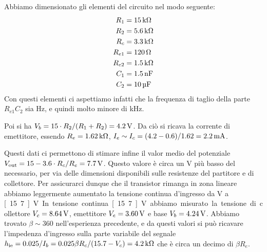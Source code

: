 \documentclass[italian,a4paper]{article}
\begin{document}
Abbiamo dimensionato gli elementi del circuito nel modo seguente:
\begin{align*}
    R_1 &= \unit[15]{k\ohm}\\
    R_2 &= \unit[5.6]{k\ohm}\\
    R_c &= \unit[3.3]{k\ohm}\\
    R_{e1} &= \unit[120]{\ohm}\\
    R_{e2} &= \unit[1.5]{k\ohm}\\
    C_1 &= \unit[1.5]{nF}\\
    C_2 &= \unit[10]{\micro F}\\
\end{align*}
Con questi elementi ci aspettiamo infatti che la frequenza di taglio della
parte $R_{e1}C_2$ sia \unit[134]{Hz}, e quindi molto minore di
\unit[20]{kHz}.

Poi si ha $V_b = 15\cdot R_2/(R_1 +
R_2) = \unit[4.2]{V}$. Da ciò si ricava la corrente di emettitore, essendo $R_e =
\unit[1.62]{k\ohm}$, $I_e \sim I_c = (4.2-0.6)/1.62 = \unit[2.2]{mA}$.

Questi dati ci permettono di stimare infine il valor medio del potenziale $V_\text{out}
= 15 - 3.6\cdot R_c/R_e = \unit[7.7]{V}$. Questo valore è circa un V più
basso del necessario, per via delle dimensioni disponibili sulle
resistenze del partitore e di collettore. Per assicurarci dunque che il
transistor rimanga in zona lineare abbiamo leggermente aumentato la
tensione continua d'ingresso da \unit[15]{V} a \unit[15.7]{V}.

In tensione continua \unit[15.7]{V} abbiamo misurato la tensione di
collettore $V_c = \unit[8.64]{V}$, emettitore $V_e = \unit[3.60]{V}$ e base
$V_b = \unit[4.24]{V}$. Abbiamo trovato $\beta \sim 360$ nell'esperienza
precedente, e da questi valori si può ricavare l'impedenza
d'ingresso sulla parte variabile del segnale $h_{\text{ie}} = 0.025 / I_b =
0.025\beta R_c /(15.7-V_c) = \unit[4.2]{k\ohm}$ che è circa un decimo di
$\beta R_e$.
\end{document}
